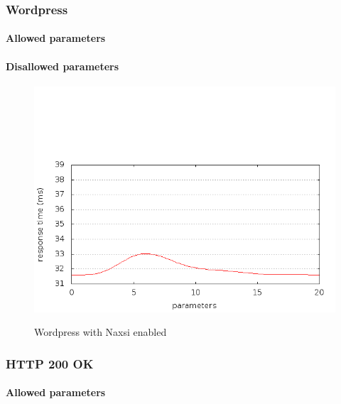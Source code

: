 \documentclass[Measurements]{subfiles}
\begin{document}
\subsubsection{Wordpress}

\paragraph{Allowed parameters}

\paragraph{Disallowed parameters}

\begin{figure}[H]
\caption{Wordpress with Naxsi enabled}
\centering
\includegraphics[scale=0.55] {images/results/wp_with_naxsi_incremented_disallowed_parameters/output.png}
\label{fig:Baseline performance measurement}
\end{figure}

\subsubsection{HTTP 200 OK}

\paragraph{Allowed parameters}
\end{document}
